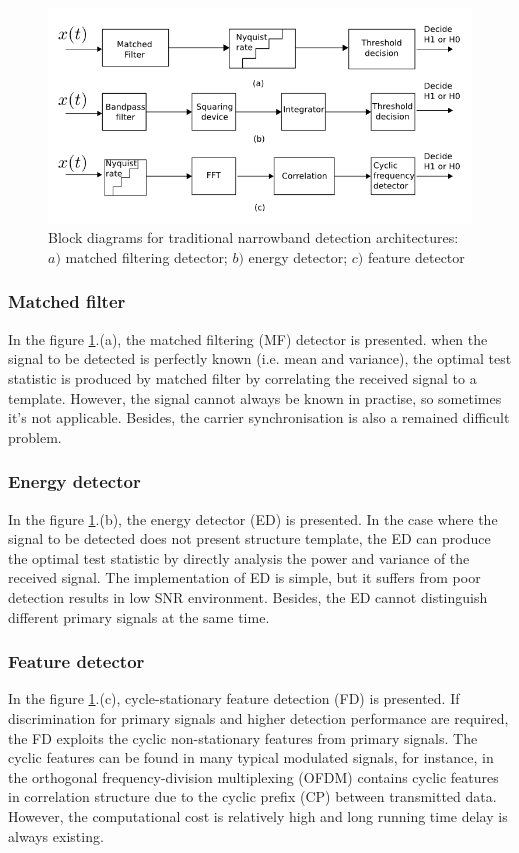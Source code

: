 \begin{figure}
\centering
\includegraphics[width=0.75\columnwidth]{figs/narr_spec_sens.png}
\caption{Block diagrams for traditional narrowband detection architectures: $a)$ matched filtering detector; $b)$ energy detector; $c)$ feature detector}
\label{narr_spec_sens}
\end{figure}

\subsubsection{Matched filter}
In the figure \ref{narr_spec_sens}.(a), the matched filtering (MF) detector\cite{poor1994introduction} is presented. when the signal to be detected is perfectly known (i.e. mean and variance), the optimal test statistic is produced by matched filter by correlating the received signal to a template. However, the signal cannot always be known in practise, so sometimes it's not applicable. Besides, the carrier synchronisation is also a remained difficult problem.

\subsubsection{Energy detector}
In the figure \ref{narr_spec_sens}.(b), the energy detector (ED) \cite{urkowitz1967energy} is presented. In the case where the signal to be detected does not present structure template, the ED can produce the optimal test statistic by directly analysis the power and variance of the received signal. The implementation of ED is simple, but it suffers from poor detection results in low SNR environment. Besides, the ED cannot distinguish different primary signals at the same time.

\subsubsection{Feature detector}
In the figure \ref{narr_spec_sens}.(c), cycle-stationary feature detection (FD) \cite{enserink1994cyclostationary} is presented. If discrimination for primary signals and higher detection performance are required, the FD exploits the cyclic non-stationary features from primary signals. The cyclic features can be found in many typical modulated signals, for instance, in the orthogonal frequency-division multiplexing (OFDM) contains cyclic features in correlation structure due to the cyclic prefix (CP) between transmitted data. However, the computational cost is relatively high and long running time delay is always existing. 

